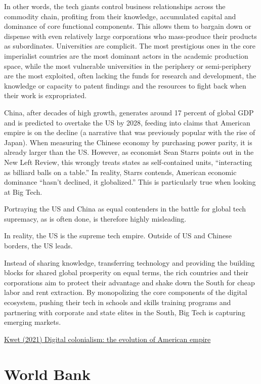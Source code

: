\documentclass[
]{book}
\begin{document}
In other words, the tech giants control business relationships across the commodity chain, profiting from their knowledge, accumulated capital and dominance of core functional components. This allows them to bargain down or dispense with even relatively large corporations who mass-produce their products as subordinates. Universities are complicit. The most prestigious ones in the core imperialist countries are the most dominant actors in the academic production space, while the most vulnerable universities in the periphery or semi-periphery are the most exploited, often lacking the funds for research and development, the knowledge or capacity to patent findings and the resources to fight back when their work is expropriated.

China, after decades of high growth, generates around 17 percent of global GDP and is predicted to overtake the US by 2028, feeding into claims that American empire is on the decline (a narrative that was previously popular with the rise of Japan). When measuring the Chinese economy by purchasing power parity, it is already larger than the US. However, as economist Sean Starrs points out in the New Left Review, this wrongly treats states as self-contained units, ``interacting as billiard balls on a table.'' In reality, Starrs contends, American economic dominance ``hasn't declined, it globalized.'' This is particularly true when looking at Big Tech.

Portraying the US and China as equal contenders in the battle for global tech supremacy, as is often done, is therefore highly misleading.

In reality, the US is the supreme tech empire. Outside of US and Chinese borders, the US leads.

Instead of sharing knowledge, transferring technology and providing the building blocks for shared global prosperity on equal terms, the rich countries and their corporations aim to protect their advantage and shake down the South for cheap labor and rent extraction. By monopolizing the core components of the digital ecosystem, pushing their tech in schools and skills training programs and partnering with corporate and state elites in the South, Big Tech is capturing emerging markets.

\href{https://roarmag.org/essays/digital-colonialism-the-evolution-of-american-empire}{Kwet (2021) Digital colonialism: the evolution of American empire}

\hypertarget{world-bank}{%
\section{World Bank}\label{world-bank}}
\end{document}
